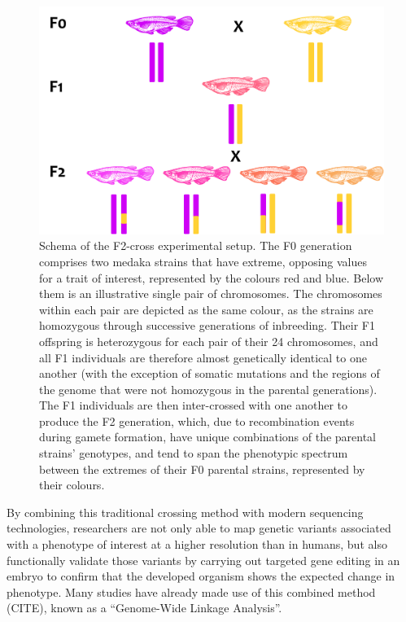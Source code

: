 \documentclass[
]{book}
\begin{document}
\begin{figure}
\includegraphics[width=1\linewidth]{figs/mikk_behaviour/F2-cross-schema} \caption{Schema of the F2-cross experimental setup. The F0 generation comprises two medaka strains that have extreme, opposing values for a trait of interest, represented by the colours red and blue. Below them is an illustrative single pair of chromosomes. The chromosomes within each pair are depicted as the same colour, as the strains are homozygous through successive generations of inbreeding. Their F1 offspring is heterozygous for each pair of their 24 chromosomes, and all F1 individuals are therefore almost genetically identical to one another (with the exception of somatic mutations and the regions of the genome that were not homozygous in the parental generations). The F1 individuals are then inter-crossed with one another to produce the F2 generation, which, due to recombination events during gamete formation, have unique combinations of the parental strains' genotypes, and tend to span the phenotypic spectrum between the extremes of their F0 parental strains, represented by their colours.}\label{fig:F2-cross-schema}
\end{figure}

By combining this traditional crossing method with modern sequencing technologies, researchers are not only able to map genetic variants associated with a phenotype of interest at a higher resolution than in humans, but also functionally validate those variants by carrying out targeted gene editing in an embryo to confirm that the developed organism shows the expected change in phenotype. Many studies have already made use of this combined method (CITE), known as a ``Genome-Wide Linkage Analysis''.
\end{document}
